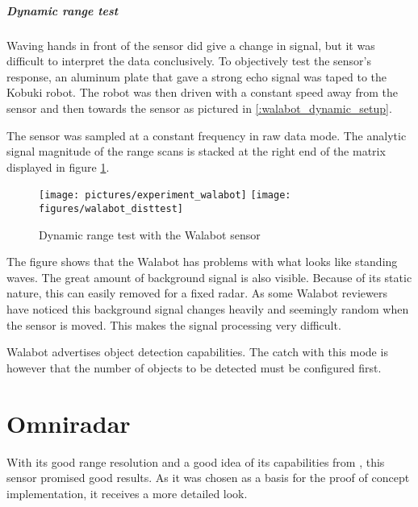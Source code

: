 \subparagraph{Dynamic range test}\label{dynamic-range-test}

Waving hands in front of the sensor did give a change in signal, but it
was difficult to interpret the data conclusively. To objectively test
the sensor's response, an aluminum plate that gave a strong echo signal
was taped to the Kobuki robot. The robot was then driven with a constant
speed away from the sensor and then towards the sensor as pictured in
\ref{:walabot_dynamic_setup}.

The sensor was sampled at a constant frequency in raw data mode. The
analytic signal magnitude of the range scans is stacked at the right end of the
matrix displayed in figure \ref{fig:walabot_dynamic_data}.


\begin{figure}[htbp]
    \centering
        {\texttt{[image: pictures/experiment\_walabot]}}
        \label{fig:walabot_dynamic_setup}
    \quad
        {\texttt{[image: figures/walabot\_disttest]}}
        \label{fig:walabot_dynamic_data}
    \caption{Dynamic range test with the Walabot sensor}
\end{figure}

The figure shows that the Walabot has problems with what looks like
standing waves. The great amount of background signal is also visible.
Because of its static nature, this can easily removed for a fixed radar.
As some Walabot reviewers have noticed \cite{Valens2016} this background
signal changes heavily and seemingly random when the sensor is moved.
This makes the signal processing very difficult.

Walabot advertises object detection capabilities. The catch with this
mode is however that the number of objects to be detected must be
configured first.

\section{Omniradar}\label{omniradar}

With its good range resolution and a good idea of its capabilities from
\cite{Ernst2016}, this sensor promised good results. As it was chosen as
a basis for the proof of concept implementation, it receives a more
detailed look.

